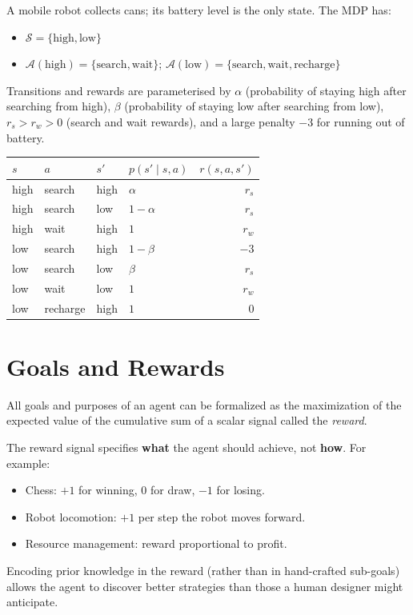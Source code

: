 \documentclass[11pt,a4paper]{article}
\theoremstyle{definition}
\theoremstyle{plain}
\theoremstyle{remark}
\begin{document}
A mobile robot collects cans; its battery level is the only state. The MDP has:
\begin{itemize}
    \item $\mathcal{S} = \{\text{high}, \text{low}\}$
    \item $\mathcal{A}(\text{high}) = \{\text{search}, \text{wait}\}$; $\mathcal{A}(\text{low}) = \{\text{search}, \text{wait}, \text{recharge}\}$
\end{itemize}
Transitions and rewards are parameterised by $\alpha$ (probability of staying high after searching from high), $\beta$ (probability of staying low after searching from low), $r_s > r_w > 0$ (search and wait rewards), and a large penalty $-3$ for running out of battery.

\begin{center}
\begin{tabular}{llllr}
\hline
$s$ & $a$ & $s'$ & $p(s'\mid s,a)$ & $r(s,a,s')$ \\
\hline
high & search & high & $\alpha$      & $r_s$ \\
high & search & low  & $1-\alpha$    & $r_s$ \\
high & wait   & high & $1$           & $r_w$ \\
low  & search & high & $1-\beta$     & $-3$  \\
low  & search & low  & $\beta$       & $r_s$ \\
low  & wait   & low  & $1$           & $r_w$ \\
low  & recharge& high& $1$           & $0$   \\
\hline
\end{tabular}
\end{center}

\section{Goals and Rewards}

\begin{tcolorbox}[colback=green!5!white, colframe=green!60!black, title={Reward Hypothesis}]
All goals and purposes of an agent can be formalized as the maximization of the expected value of the cumulative sum of a scalar signal called the \emph{reward}.
\end{tcolorbox}

The reward signal specifies \textbf{what} the agent should achieve, not \textbf{how}. For example:
\begin{itemize}
    \item Chess: $+1$ for winning, $0$ for draw, $-1$ for losing.
    \item Robot locomotion: $+1$ per step the robot moves forward.
    \item Resource management: reward proportional to profit.
\end{itemize}
Encoding prior knowledge in the reward (rather than in hand-crafted sub-goals) allows the agent to discover better strategies than those a human designer might anticipate.
\end{document}

